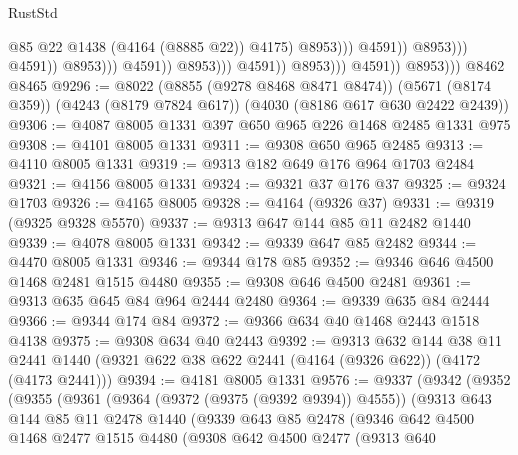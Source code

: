 \begin{lexlean}{RustStd}
\begin{coremodule}
                                                              @85
                                                              @22
                                                              @1438
                                                              (@4164 (@8885 @22))
                                                              @4175)
                                                            @8953)))
                                                      @4591))
                                                  @8953)))
                                            @4591))
                                        @8953)))
                                  @4591))
                              @8953)))
                        @4591))
                    @8953)))
              @4591))
          @8953)))
    @8462
    @8465
@9296 := @8022
    (@8855 (@9278 @8468 @8471 @8474))
    (@5671 (@8174 @359))
    (@4243 (@8179 @7824 @617))
    (@4030 (@8186 @617 @630 @2422 @2439))
@9306 := @4087 @8005 @1331 @397 @650 @965 @226 @1468 @2485 @1331 @975
@9308 := @4101 @8005 @1331
@9311 := @9308 @650 @965 @2485
@9313 := @4110 @8005 @1331
@9319 := @9313 @182 @649 @176 @964 @1703 @2484
@9321 := @4156 @8005 @1331
@9324 := @9321 @37 @176 @37
@9325 := @9324 @1703
@9326 := @4165 @8005
@9328 := @4164 (@9326 @37)
@9331 := @9319 (@9325 @9328 @5570)
@9337 := @9313 @647 @144 @85 @11 @2482 @1440
@9339 := @4078 @8005 @1331
@9342 := @9339 @647 @85 @2482
@9344 := @4470 @8005 @1331
@9346 := @9344 @178 @85
@9352 := @9346 @646 @4500 @1468 @2481 @1515 @4480
@9355 := @9308 @646 @4500 @2481
@9361 := @9313 @635 @645 @84 @964 @2444 @2480
@9364 := @9339 @635 @84 @2444
@9366 := @9344 @174 @84
@9372 := @9366 @634 @40 @1468 @2443 @1518 @4138
@9375 := @9308 @634 @40 @2443
@9392 := @9313
    @632
    @144
    @38
    @11
    @2441
    @1440
    (@9321 @622 @38 @622 @2441 (@4164 (@9326 @622)) (@4172 (@4173 @2441)))
@9394 := @4181 @8005 @1331
@9576 := @9337
    (@9342
      (@9352
        (@9355
          (@9361
            (@9364 (@9372 (@9375 (@9392 @9394)) @4555))
            (@9313
              @643
              @144
              @85
              @11
              @2478
              @1440
              (@9339
                @643
                @85
                @2478
                (@9346
                  @642
                  @4500
                  @1468
                  @2477
                  @1515
                  @4480
                  (@9308
                    @642
                    @4500
                    @2477
                    (@9313
                      @640

\end{coremodule}
\end{lexlean}
